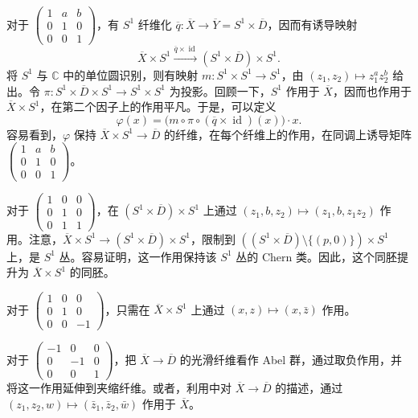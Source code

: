 对于 $\begin{pmatrix}1&a&b\\0&1&0\\0&0&1\end{pmatrix}$，有 $S^1$ 纤维化 $\overline q\colon\overline X\to\overline Y=S^1\times\overline D$，因而有诱导映射
\[
\overline X\times S^1\xrightarrow{\overline q\times\operatorname{id}}
(S^1\times\overline D)\times S^1.
\]
将 $S^1$ 与 $\mathbb C$ 中的单位圆识别，则有映射 $m\colon S^1\times S^1\to S^1$，由 $(z_1,z_2)\mapsto z_1^a z_2^b$ 给出。令 $\pi\colon S^1\times\overline D\times S^1\to S^1\times S^1$ 为投影。回顾一下，$S^1$ 作用于 $\overline X$，因而也作用于 $\overline X\times S^1$，在第二个因子上的作用平凡。于是，可以定义
\[
\varphi(x)=\bigl(m\circ\pi\circ(\overline q\times\operatorname{id})(x)\bigr)\cdot x.
\]
容易看到，$\varphi$ 保持 $\overline X\times S^1\to\overline D$ 的纤维，在每个纤维上的作用，在同调上诱导矩阵 $\begin{pmatrix}1&a&b\\0&1&0\\0&0&1\end{pmatrix}$。

对于 $\begin{pmatrix}1&0&0\\0&1&0\\0&1&1\end{pmatrix}$，在 $(S^1\times\overline D)\times S^1$ 上通过 $(z_1,b,z_2)\mapsto(z_1,b,z_1z_2)$ 作用。注意，$\overline X\times S^1\to(S^1\times\overline D)\times S^1$，限制到 $((S^1\times\overline D)\setminus\{(p,0)\})\times S^1$ 上，是 $S^1$ 丛。容易证明，这一作用保持该 $S^1$ 丛的 Chern 类。因此，这个同胚提升为 $\overline X\times S^1$ 的同胚。

对于 $\begin{pmatrix}1&0&0\\0&1&0\\0&0&-1\end{pmatrix}$，只需在 $\overline X\times S^1$ 上通过 $(x,z)\mapsto(x,\bar z)$ 作用。

对于 $\begin{pmatrix}-1&0&0\\0&-1&0\\0&0&1\end{pmatrix}$，把 $\overline X\to\overline D$ 的光滑纤维看作 Abel 群，通过取负作用，并将这一作用延伸到夹缩纤维。或者，利用中对 $\overline X\to\overline D$ 的描述，通过 $(z_1,z_2,w)\mapsto(\bar z_1,\bar z_2,\bar w)$ 作用于 $\overline X$。

